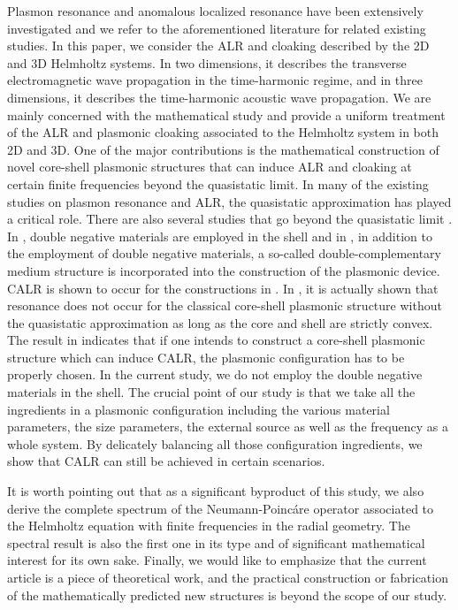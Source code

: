 \documentclass[11pt,reqno,twoside]{amsart}
\theoremstyle{definition}
\theoremstyle{remark}
\numberwithin{equation}{section}
\begin{document}
Plasmon resonance and anomalous localized resonance have been extensively investigated and we refer to the aforementioned literature for related existing studies. In this paper, we consider the ALR and cloaking described by the 2D and 3D Helmholtz systems. In two dimensions, it describes the transverse electromagnetic wave propagation in the time-harmonic regime, and in three dimensions, it describes the time-harmonic acoustic wave propagation. We are mainly concerned with the mathematical study and provide a uniform treatment of the ALR and plasmonic cloaking associated to the Helmholtz system in both 2D and 3D. One of the major contributions is the mathematical construction of novel core-shell plasmonic structures that can induce ALR and cloaking at certain finite frequencies beyond the quasistatic limit. In many of the existing studies on plasmon resonance and ALR, the quasistatic approximation has played a critical role. There are also several studies that go beyond the quasistatic limit \cite{GWM3,KLO,Ngu2}. In \cite{GWM3}, double negative materials are employed in the shell and in \cite{Ngu2}, in addition to the employment of double negative materials, a so-called double-complementary medium structure is incorporated into the construction of the plasmonic device. CALR is shown to occur for the constructions in \cite{GWM3,Ngu2}. In \cite{KLO}, it is actually shown that resonance does not occur for the classical core-shell plasmonic structure without the quasistatic approximation as long as the core and shell are strictly convex. The result in \cite{GWM3,KLO} indicates that if one intends to construct a core-shell plasmonic structure which can induce CALR, the plasmonic configuration has to be properly chosen. In the current study, we do not employ the double negative materials in the shell. The crucial point of our study is that we take all the ingredients in a plasmonic configuration including the various material parameters, the size parameters, the external source as well as the frequency as a whole system. By delicately balancing all those configuration ingredients, we show that CALR can still be achieved in certain scenarios. 


It is worth pointing out that as a significant byproduct of this study, we also derive the complete spectrum of the Neumann-Poinc\'are operator associated to the Helmholtz equation with finite frequencies in the radial geometry. The spectral result is also the first one in its type and of significant mathematical interest for its own sake. Finally, we would like to emphasize that the current article is a piece of theoretical work, and the practical construction or fabrication of the mathematically predicted new structures is beyond the scope of our study.
\end{document}
